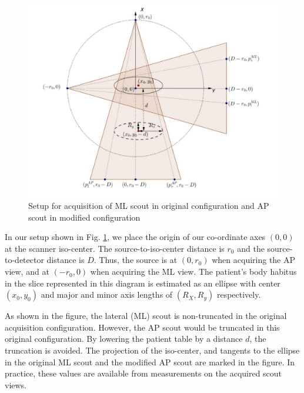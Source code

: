 \documentclass[]{spie}
\begin{document}
%
\begin{figure}[hbtp]
\centering
\includegraphics[width=15 cm]{figures/scoutIT_geometry-algebra}
\caption{Setup for acquisition of ML scout  in original configuration and AP scout in modified configuration \label{fig:scoutIT_geometry}
}
\end{figure}

In our setup shown in Fig. \ref{fig:scoutIT_geometry}, we place the origin of our co-ordinate axes $\left( 0, 0 \right)$ at the scanner iso-center. The source-to-iso-center distance is $r_0$ and the source-to-detector distance is $D$. Thus, the source is at $\left( 0, r_0 \right)$ when acquiring the AP view, and at $\left( -r_0, 0 \right)$ when acquiring the ML view. The patient's body habitus in the slice represented in this diagram is estimated as an ellipse with center $\left( x_0, y_0 \right)$ and major and minor axis lengths of $\left( R_X, R_y \right)$ respectively. 

As shown in the figure, the lateral (ML) scout is non-truncated in the original acquisition configuration. However, the AP scout would be truncated in this original configuration. By lowering the patient table by a distance $d$, the truncation is avoided. The projection of the iso-center, and tangents to the ellipse in the original ML scout and the modified AP scout are marked in the figure. In practice, these values are available from measurements on the acquired scout views. 
\end{document}
